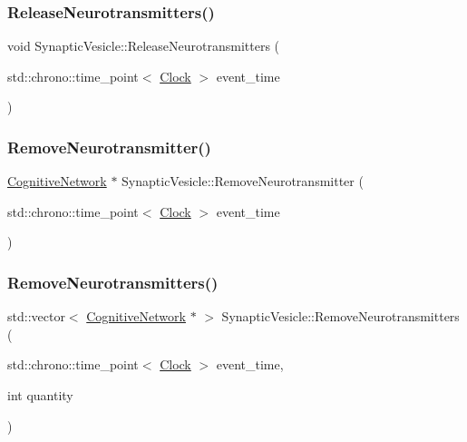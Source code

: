 \mbox{\label{classSynapticVesicle_a2509969e82fee789cc56fb0978f27662}} 
\subsubsection{\texorpdfstring{Release\+Neurotransmitters()}{ReleaseNeurotransmitters()}}
{\footnotesize\ttfamily void Synaptic\+Vesicle\+::\+Release\+Neurotransmitters (\begin{DoxyParamCaption}\item[{std\+::chrono\+::time\+\_\+point$<$ \mbox{\hyperlink{universe_8h_a0ef8d951d1ca5ab3cfaf7ab4c7a6fd80}{Clock}} $>$}]{event\+\_\+time }\end{DoxyParamCaption})}

\mbox{\label{classSynapticVesicle_a7ea7841bd1a7a17c78a023db8860cc22}} 
\subsubsection{\texorpdfstring{Remove\+Neurotransmitter()}{RemoveNeurotransmitter()}}
{\footnotesize\ttfamily \mbox{\hyperlink{classCognitiveNetwork}{Cognitive\+Network}} $\ast$ Synaptic\+Vesicle\+::\+Remove\+Neurotransmitter (\begin{DoxyParamCaption}\item[{std\+::chrono\+::time\+\_\+point$<$ \mbox{\hyperlink{universe_8h_a0ef8d951d1ca5ab3cfaf7ab4c7a6fd80}{Clock}} $>$}]{event\+\_\+time }\end{DoxyParamCaption})}

\mbox{\label{classSynapticVesicle_aab1e61b4910399d56071ca59f2758e72}} 
\subsubsection{\texorpdfstring{Remove\+Neurotransmitters()}{RemoveNeurotransmitters()}}
{\footnotesize\ttfamily std\+::vector$<$ \mbox{\hyperlink{classCognitiveNetwork}{Cognitive\+Network}} $\ast$ $>$ Synaptic\+Vesicle\+::\+Remove\+Neurotransmitters (\begin{DoxyParamCaption}\item[{std\+::chrono\+::time\+\_\+point$<$ \mbox{\hyperlink{universe_8h_a0ef8d951d1ca5ab3cfaf7ab4c7a6fd80}{Clock}} $>$}]{event\+\_\+time,  }\item[{int}]{quantity }\end{DoxyParamCaption})}

